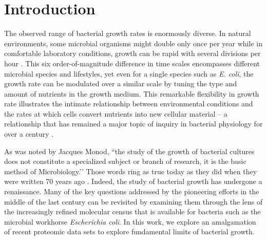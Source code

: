 \section{Introduction}
The observed range of bacterial growth rates is enormously diverse. In
natural environments, some microbial organisms might double only once per
year \citep{mikucki2009} while in comfortable laboratory conditions, growth
can be rapid with several divisions per hour \citep{schaechter1958}. This six
order-of-magnitude difference in time scales encompasses different microbial
species and lifestyles, yet even for a single species such as \textit{E.
coli}, the growth rate can be modulated over a similar scale by tuning the
type and amount of nutrients in the growth medium. This remarkable
flexibility in growth rate illustrates the intimate relationship between
environmental conditions and the rates at which cells convert nutrients into
new cellular material -- a relationship that has remained a major topic of
inquiry in bacterial physiology for over a century \citep{jun2018}.

As was noted by Jacques Monod, ``the study of the growth of bacterial
cultures does not constitute a specialized subject or branch of research, it
is the basic method of Microbiology.’’ Those words ring as true today as they
did when they were written 70 years ago \citep{monod1949}. Indeed, the study
of bacterial growth has undergone a renaissance. Many of the key questions
addressed by the pioneering efforts in the middle of the last century can be
revisited by examining them through the lens of the increasingly refined
molecular census that is available for bacteria such as the microbial
workhorse \textit{Escherichia coli}. In this work, we explore an amalgamation
of recent proteomic data sets to explore fundamental limits of bacterial growth.

